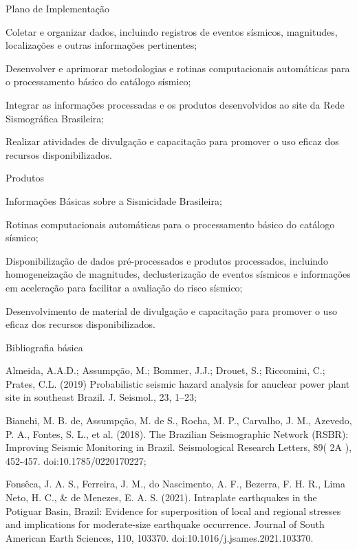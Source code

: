 \documentclass[10pt,a4paper,oneside]{book}
\begin{document}
\begin{fancyenum}{\faBrain}{Plano de Implementação}
	\item Coletar e organizar dados, incluindo registros de eventos sísmicos, magnitudes, localizações e outras informações pertinentes;
	\item Desenvolver e aprimorar metodologias e rotinas computacionais automáticas para o processamento básico do catálogo sísmico;
	\item Integrar as informações processadas e os produtos desenvolvidos ao site da Rede Sismográfica Brasileira;
	\item Realizar atividades de divulgação e capacitação para promover o uso eficaz dos recursos disponibilizados.
\end{fancyenum}

\begin{fancyenum}{\faShoppingCart}{Produtos}
	\item Informações Básicas sobre a Sismicidade Brasileira;
	\item Rotinas computacionais automáticas para o processamento básico do catálogo sísmico;	
	\item Disponibilização de dados pré-processados e produtos processados, incluindo homogeneização de magnitudes, declusterização de eventos sísmicos e informações em aceleração para facilitar a avaliação do risco sísmico;
	\item Desenvolvimento de material de divulgação e capacitação para promover o uso eficaz dos recursos disponibilizados.
\end{fancyenum}

\begin{fancyenum}{\faBook}{Bibliografia básica}
	\item Almeida, A.A.D.; Assumpção, M.; Bommer, J.J.; Drouet, S.; Riccomini, C.; Prates, C.L. (2019) Probabilistic seismic hazard analysis for anuclear power plant site in southeast Brazil. J. Seismol., 23, 1–23;
	\item Bianchi, M. B. de, Assumpção, M. de S., Rocha, M. P., Carvalho, J. M., Azevedo, P. A., Fontes, S. L., et al. (2018). The Brazilian Seismographic Network (RSBR): Improving Seismic Monitoring in Brazil. Seismological Research Letters, 89( 2A ), 452-457. doi:10.1785/0220170227;
	\item Fonsêca, J. A. S., Ferreira, J. M., do Nascimento, A. F., Bezerra, F. H. R., Lima Neto, H. C., \& de Menezes, E. A. S. (2021). Intraplate earthquakes in the Potiguar Basin, Brazil: Evidence for superposition of local and regional stresses and implications for moderate-size earthquake occurrence. Journal of South American Earth Sciences, 110, 103370. doi:10.1016/j.jsames.2021.103370. 
\end{fancyenum}
\end{document}
